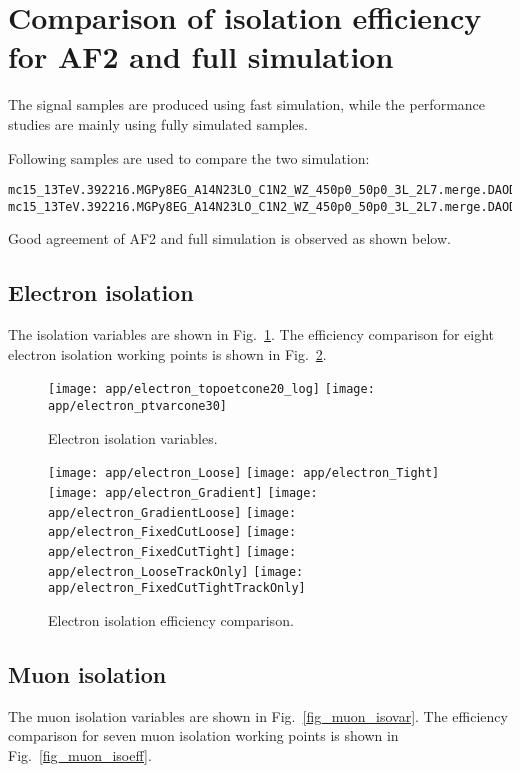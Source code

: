\section{Comparison of isolation efficiency for AF2 and full simulation}
\label{app_AF2_iso}

The signal samples are produced using fast simulation, while the performance studies are mainly using fully simulated samples.

Following samples are used to compare the two simulation:
\scriptsize
\begin{verbatim}
mc15_13TeV.392216.MGPy8EG_A14N23LO_C1N2_WZ_450p0_50p0_3L_2L7.merge.DAOD_SUSY2.e4287_s2608_s2183_r6869_r6282_p2419
mc15_13TeV.392216.MGPy8EG_A14N23LO_C1N2_WZ_450p0_50p0_3L_2L7.merge.DAOD_SUSY2.e4287_a766_a777_r6282_p2419
\end{verbatim}
\normalsize

Good agreement of AF2 and full simulation is observed as shown below.
\subsection{Electron isolation}
The isolation variables are shown in Fig.~\ref{fig_el_isovar}. The efficiency comparison for eight electron isolation working points is shown in Fig.~\ref{fig_el_isoeff}.

\begin{figure}
\texttt{[image: app/electron\_topoetcone20\_log]}
\texttt{[image: app/electron\_ptvarcone30]} 
\caption{Electron isolation variables.}
\label{fig_el_isovar}
\end{figure}

\begin{figure}
\texttt{[image: app/electron\_Loose]}
\texttt{[image: app/electron\_Tight]}
\texttt{[image: app/electron\_Gradient]}
\texttt{[image: app/electron\_GradientLoose]}
\texttt{[image: app/electron\_FixedCutLoose]}
\texttt{[image: app/electron\_FixedCutTight]}
\texttt{[image: app/electron\_LooseTrackOnly]}
\texttt{[image: app/electron\_FixedCutTightTrackOnly]}
\caption{Electron isolation efficiency comparison.}
\label{fig_el_isoeff}
\end{figure}


\subsection{Muon isolation}
The muon isolation variables are shown in Fig.~\ref{fig_muon_isovar}.
The efficiency comparison for seven muon isolation working points is shown in Fig.~\ref{fig_muon_isoeff}.

